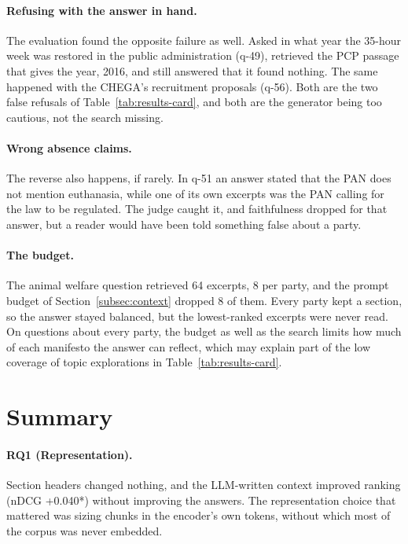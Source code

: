 \paragraph{Refusing with the answer in hand.} The evaluation found the
opposite failure as well. Asked in what year the 35-hour week was restored in
the public administration (q-49), \sysname{} retrieved the PCP passage that
gives the year, 2016, and still answered that it found nothing. The same
happened with the CHEGA's recruitment proposals (q-56). Both are the two false
refusals of Table~\ref{tab:results-card}, and both are the generator being
too cautious, not the search missing.

\paragraph{Wrong absence claims.} The reverse also happens, if rarely. In
q-51 an answer stated that the PAN does not mention euthanasia, while one of
its own excerpts was the PAN calling for the law to be regulated. The judge
caught it, and faithfulness dropped for that answer, but a reader would have
been told something false about a party.

\paragraph{The budget.} The animal welfare question retrieved 64 excerpts, 8
per party, and the prompt budget of Section~\ref{subsec:context} dropped 8 of
them. Every party kept a section, so the answer stayed balanced, but the
lowest-ranked excerpts were never read. On questions about every party, the
budget as well as the search limits how much of each manifesto the answer can
reflect, which may explain part of the low coverage of topic explorations in
Table~\ref{tab:results-card}.

\section{Summary} \label{sec:results-summary}

\paragraph{RQ1 (Representation).} Section headers changed nothing, and the
LLM-written context improved ranking (nDCG +0.040*) without improving the
answers. The representation choice that mattered was sizing chunks in the
encoder's own tokens, without which most of the corpus was never embedded.

